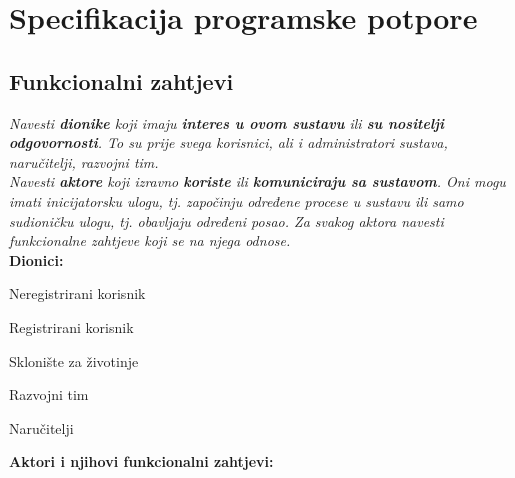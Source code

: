 \chapter{Specifikacija programske potpore}
		
	\section{Funkcionalni zahtjevi}
			
			\textit{Navesti \textbf{dionike} koji imaju \textbf{interes u ovom sustavu} ili  \textbf{su nositelji odgovornosti}. To su prije svega korisnici, ali i administratori sustava, naručitelji, razvojni tim.}\\
				
			\textit{Navesti \textbf{aktore} koji izravno \textbf{koriste} ili \textbf{komuniciraju sa sustavom}. Oni mogu imati inicijatorsku ulogu, tj. započinju određene procese u sustavu ili samo sudioničku ulogu, tj. obavljaju određeni posao. Za svakog aktora navesti funkcionalne zahtjeve koji se na njega odnose.}\\
			
			
			\noindent \textbf{Dionici:}
			
			\begin{packed_enum}
				
				\item Neregistrirani korisnik
				\item Registrirani korisnik			
				\item Sklonište za životinje
				\item Razvojni tim
				\item Naručitelji
				
			\end{packed_enum}
			
			\noindent \textbf{Aktori i njihovi funkcionalni zahtjevi:}
			
